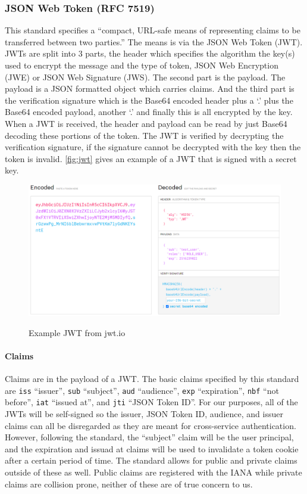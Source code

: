\subsubsection{JSON Web Token (RFC 7519)}
This standard specifies a ``compact, URL-safe means of representing claims to be transferred between two parties.'' The means is via the JSON Web Token (JWT). JWTs are split into 3 parts, the header which specifies the algorithm the key(s) used to encrypt the message and the type of token, JSON Web Encryption (JWE) or JSON Web Signature (JWS). The second part is the payload. The payload is a JSON formatted object which carries claims. And the third part is the verification signature which is the Base64 encoded header plus a `.' plus the Base64 encoded payload, another `.' and finally this is all encrypted by the key. When a JWT is received, the header and payload can be read by just Base64 decoding these portions of the token. The JWT is verified by decrypting the verification signature, if the signature cannot be decrypted with the key then the token is invalid. \autoref{fig:jwt} gives an example of a JWT that is signed with a secret key.
\begin{figure}[H]
    \centering
    \caption{Example JWT from jwt.io}
    \includegraphics[width=\textwidth]{images/jwt.png}
    \label{fig:jwt}
\end{figure}

\paragraph{Claims}
Claims are in the payload of a JWT. The basic claims specified by this standard are \verb|iss| ``issuer'', \verb|sub| ``subject'', \verb|aud| ``audience'', \verb|exp| ``expiration'', \verb|nbf| ``not before'', \verb|iat| ``issued at'', and \verb|jti| ``JSON Token ID''. For our purposes, all of the JWTs will be self-signed so the issuer, JSON Token ID, audience, and issuer claims can all be disregarded as they are meant for cross-service authentication. However, following the standard, the ``subject'' claim will be the user principal, and the expiration and issuad at claims will be used to invalidate a token cookie after a certain period of time. The standard allows for public and private claims outside of these as well. Public claims are registered with the IANA while private claims are collision prone, neither of these are of true concern to us.
